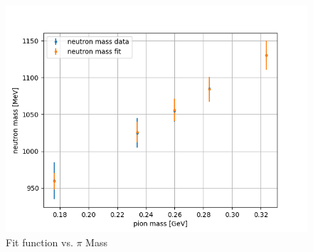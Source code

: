 \documentclass{article}
\begin{document}
\begin{enumerate}
\begin{figure}[h!]
    \centering
    \includegraphics[width = .7\linewidth]{mass.png}
    \caption{Fit function vs. $\pi$ Mass}
    \label{fig:mass}
\end{figure}

\end{enumerate}
\end{document}
